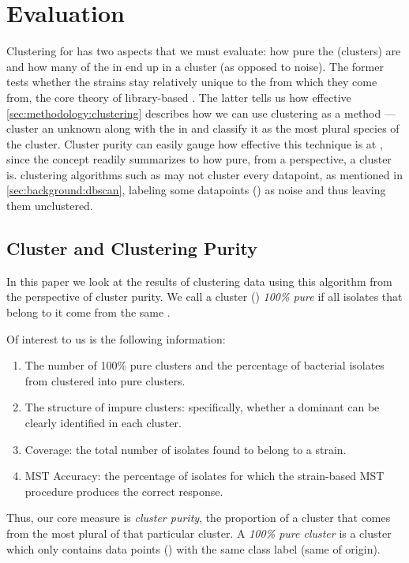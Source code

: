 \section{Evaluation}\label{sec:evaluation:clustering}
Clustering for \bslongs{} has two aspects that we must evaluate: how pure the \bslongs{} (clusters) are and how many of the \isols{} in \cplop{} end up in a cluster (as opposed to noise).
The former tests whether the \ecoli{} strains stay relatively unique to the \spec{} from which they come from, the core theory of library-based \mst{}.
The latter tells us how effective 
\autoref{sec:methodology:clustering} describes how we can use clustering as a \mst{} method --- cluster an unknown \isol{} along with the \isols{} in \cplop{} and classify it as the most plural species of the cluster.
Cluster purity can easily gauge how effective this technique is at \mst{}, since the concept readily summarizes to how pure, from a \spec{} perspective, a cluster is.
\Dbased{} clustering algorithms such as \dbscan{} may not cluster every datapoint, as mentioned in \autoref{sec:background:dbscan},  labeling some datapoints (\isols{}) as noise and thus leaving them unclustered.

\subsection{Cluster and Clustering Purity}
In this paper we look at the results of clustering \cplop{} data using this algorithm from the perspective of cluster purity. We call a cluster (\bslong{}) \textit{100\% pure}
if all isolates that belong to it come from the same \spec{}. 

Of interest to us is the following information:
\begin{enumerate}
    \item The number of 100\% pure clusters and the percentage of bacterial isolates from \cplop{} clustered into pure clusters.
    \item The structure of impure clusters: specifically, whether a dominant \spec{} can
    be clearly identified in each cluster.
    \item Coverage: the total number of \cplop{} isolates found to belong to a strain.
    \item MST Accuracy: the percentage of isolates for which the strain-based MST procedure produces the correct response.
\end{enumerate}
Thus, our core measure is \textit{cluster purity}, the proportion of a cluster that comes from the most plural \spec{} of that particular cluster.
A \textit{100\% pure cluster} is a cluster which only contains data points (\isols{}) with the same class label (same \spec{} of origin). 

